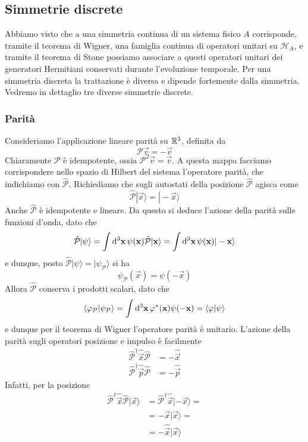 \documentclass[a4paper, 11pt]{article}
\newcommand{\op}[1]{\hat{#1}}
\renewcommand{\H}{\mathcal{H}}
\renewcommand{\op}[1]{\hat{#1}}
\renewcommand{\ket}[1]{| #1\rangle}
\begin{document}
\subsection{Simmetrie discrete}
Abbiamo visto che a una simmetria continua di un sistema fisico $A$ corrisponde, tramite il teorema di Wigner, una famiglia continua di operatori unitari su $\H_A$, e tramite il teorema di Stone possiamo associare a questi operatori unitari dei generatori Hermitiani conservati durante l'evoluzione temporale. Per una simmetria discreta la trattazione è diversa e dipende fortemente dalla simmetria. Vedremo in dettaglio tre diverse simmetrie discrete.
\subsubsection{Parità}
Consideriamo l'applicazione lineare parità su $\mathbb{R}^3$, definita da
\[\mathcal{P}\vec{v}=-\vec{v}\]
Chiaramente $\mathcal{P}$ è idempotente, ossia $\mathcal{P}^2\vec{v}=\vec{v}$. A questa mappa facciamo corrispondere nello spazio di Hilbert del sistema l'operatore parità, che indichiamo con $\op{\mathcal{P}}$. Richiediamo che sugli autostati della posizione $\op{\mathcal{P}}$ agisca come
\[\op{\mathcal{P}}\ket{\vec{x}}=\ket{-\vec{x}}\]
Anche $\op{\mathcal{P}}$ è idempotente e lineare. Da questo si deduce l'azione della parità sulle funzioni d'onda, dato che
\[\op{\mathcal{P}}\ket{\psi}=\int\d^3\vec{x}\,\psi(\vec{x})\op{\mathcal{P}}\ket{\vec{x}}=\int\d^3\vec{x}\,\psi(\vec{x})\ket{-\vec{x}}\]
e dunque, posto $\op{\mathcal{P}}\ket{\psi}=\ket{\psi_{\mathcal{P}}}$ si ha
\[\psi_{\mathcal{P}}(\vec{x})=\psi(-\vec{x})\]
Allora $\op{\mathcal{P}}$ conserva i prodotti scalari, dato che
\[\langle \varphi_{\mathcal{P}}\vert\psi_{\mathcal{P}}\rangle=\int \mathrm{d}^3\mathbf{x}\,\varphi^*(\mathbf{x})\psi(-\mathbf{x})=\langle \varphi\vert\psi\rangle\]
e dunque per il teorema di Wigner l'operatore parità è unitario. L'azione della parità sugli operatori posizione e impulso è facilmente
\begin{align*}
	\op{\mathcal{P}}^\dagger\op{\vec{x}}\op{\mathcal{P}}&=-\op{\vec{x}}\\
	\op{\mathcal{P}}^\dagger\op{\vec{p}}\op{\mathcal{P}}&=-\op{\vec{p}}
\end{align*}
Infatti, per la posizione
\begin{align*}\op{\mathcal{P}}^\dagger\op{\vec{x}}\op{\mathcal{P}}\ket{\vec{x}}&=\op{\mathcal{P}}^\dagger\op{\vec{x}}\ket{-\vec{x}}=\\&=-\vec{x}\ket{\vec{x}}=\\&=-\op{\vec{x}}\ket{\vec{x}}\end{align*}
\end{document}
